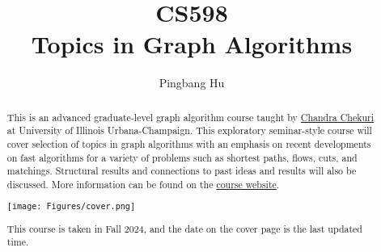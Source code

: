 \documentclass[a4paper]{report}
\author{Pingbang Hu}
\title{CS598\\Topics in Graph Algorithms}
\begin{document}
\maketitle

\begin{abstract}
	This is an advanced graduate-level graph algorithm course taught by \href{https://chekuri.cs.illinois.edu/}{Chandra Chekuri} at University of Illinois Urbana-Champaign. This exploratory seminar-style course will cover selection of topics in graph algorithms with an emphasis on recent developments on fast algorithms for a variety of problems such as shortest paths, flows, cuts, and matchings. Structural results and connections to past ideas and results will also be discussed. More information can be found on the \href{https://courses.grainger.illinois.edu/cs598csc/fa2024/}{course website}.

	\vfill
	\begin{center}
		\texttt{[image: Figures/cover.png]}
	\end{center}
	\vfill
	This course is taken in Fall 2024, and the date on the cover page is the last updated time.
\end{abstract}

\tableofcontents


\newpage
\appendix
\appendixpage{}



\newpage
\pagestyle{plain}
\printbibliography{}
\end{document}
